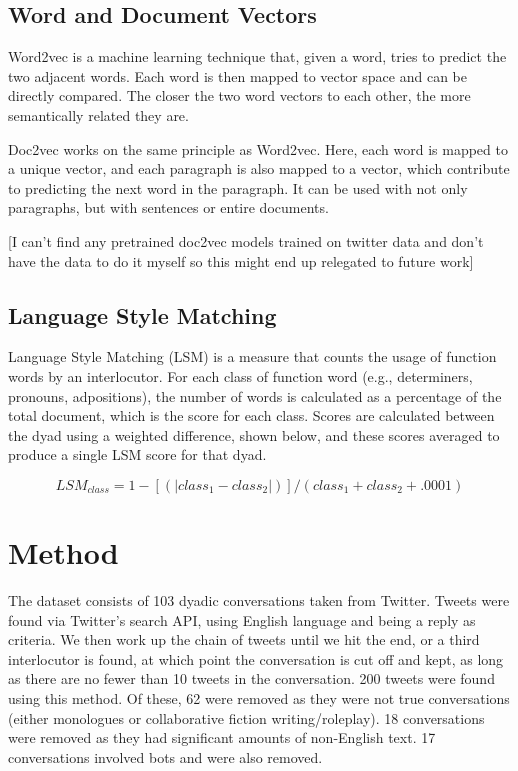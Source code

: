 \documentclass[conference]{IEEEtran}
\begin{document}
\subsection{Word and Document Vectors}
Word2vec \cite{mikolov2013efficient, mikolov2013distributed} is a machine learning technique that,
given a word, tries to predict the two adjacent words. Each word is then mapped to vector space
and can be directly compared. The closer the two word vectors to each other, the more semantically
related they are.

Doc2vec \cite{le2014distributed} works on the same principle as Word2vec. Here, each word is mapped to
a unique vector, and each paragraph is also mapped to a vector, which contribute to predicting the next
word in the paragraph. It can be used with not only paragraphs, but with sentences or entire documents.

[I can't find any pretrained doc2vec models trained on twitter data and don't have the data to do it
myself so this might end up relegated to future work] 

\subsection{Language Style Matching}
Language Style Matching (LSM) \cite{ireland2010language, ireland2011language}
is a measure that counts the usage of function words by an interlocutor.
For each class of function word (e.g., determiners, pronouns, adpositions), the number of words is 
calculated as a percentage of the total document, which is the score for each class. Scores are 
calculated between the dyad using a weighted difference, shown below, and these scores averaged to 
produce a single LSM score for that dyad.

\[ LSM_{class} = 1 - [(|class_1 - class_2|)] / (class_1 + class_2 + .0001) \]


\section{Method}
The dataset consists of 103 dyadic conversations taken from Twitter. Tweets were found via Twitter's 
search API, using English language and being a reply as criteria. We then work up the chain of tweets 
until we hit the end, or a third interlocutor is found, at which point the conversation is cut off and 
kept, as long as there are no fewer than 10 tweets in the conversation. 200 tweets were found using 
this method. Of these, 62 were removed as they were not true conversations (either monologues or 
collaborative fiction writing/roleplay). 18 conversations were removed as they had significant amounts 
of non-English text. 17 conversations involved bots and were also removed.
\end{document}
